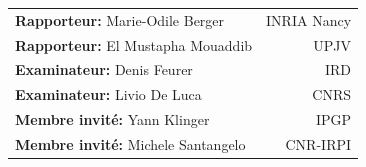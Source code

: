 \begin{titlepage}
\begin{center}
\begin{tabular}{lr}
	\textbf{Rapporteur:} Marie-Odile Berger & INRIA Nancy\\
	\textbf{Rapporteur:} El Mustapha Mouaddib & UPJV\\
	\textbf{Examinateur:} Denis Feurer & IRD\\
	\textbf{Examinateur:} Livio De Luca & CNRS\\
	\textbf{Membre invité:} Yann Klinger & IPGP\\
	\textbf{Membre invité:} Michele Santangelo & CNR-IRPI\\
\end{tabular}
\end{center}
\end{titlepage}

\sloppy

\titlepage

\restoregeometry
